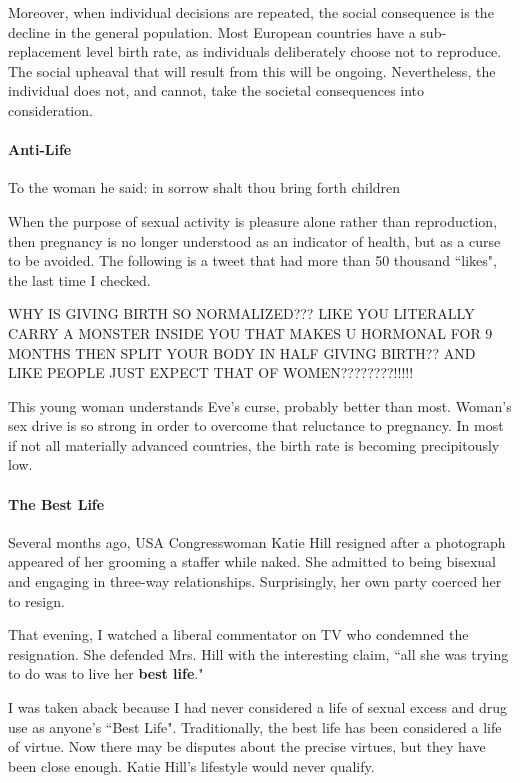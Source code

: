 Moreover, when individual decisions are repeated, the social consequence is the decline in the general population. Most European countries have a sub-replacement level birth rate, as individuals deliberately choose not to reproduce. The social upheaval that will result from this will be ongoing. Nevertheless, the individual does not, and cannot, take the societal consequences into consideration.

\paragraph{Anti-Life}
\begin{quotex}
To the woman he said: in sorrow shalt thou bring forth children 

\end{quotex}
When the purpose of sexual activity is pleasure alone rather than reproduction, then pregnancy is no longer understood as an indicator of health, but as a curse to be avoided. The following is a tweet that had more than 50 thousand ``likes", the last time I checked.

\begin{quotex}
WHY IS GIVING BIRTH SO NORMALIZED??? LIKE YOU LITERALLY CARRY A MONSTER INSIDE YOU THAT MAKES U HORMONAL FOR 9 MONTHS THEN SPLIT YOUR BODY IN HALF GIVING BIRTH?? AND LIKE PEOPLE JUST EXPECT THAT OF WOMEN????????!!!!! 

\end{quotex}
This young woman understands Eve's curse, probably better than most. Woman's sex drive is so strong in order to overcome that reluctance to pregnancy. In most if not all materially advanced countries, the birth rate is becoming precipitously low.

\paragraph{The Best Life}
Several months ago, USA Congresswoman Katie Hill resigned after a photograph appeared of her grooming a staffer while naked. She admitted to being bisexual and engaging in three-way relationships. Surprisingly, her own party coerced her to resign.

That evening, I watched a liberal commentator on TV who condemned the resignation. She defended Mrs. Hill with the interesting claim, ``all she was trying to do was to live her \textbf{best life}."

I was taken aback because I had never considered a life of sexual excess and drug use as anyone's ``Best Life". Traditionally, the best life has been considered a life of virtue. Now there may be disputes about the precise virtues, but they have been close enough. Katie Hill's lifestyle would never qualify.

